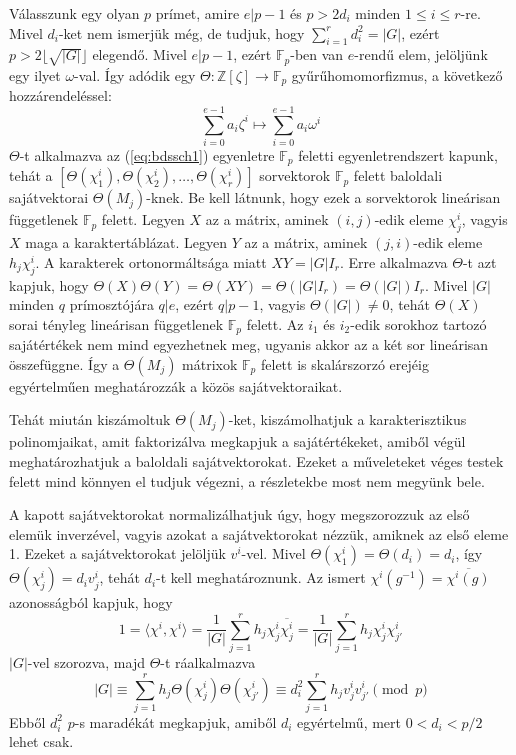 Válasszunk egy olyan $p$ prímet, amire $e|p-1$ és $p > 2 d_i$ minden $1\le i\le r$-re. Mivel $d_i$-ket nem ismerjük még, de tudjuk, hogy 
$\sum_{i=1}^r d_i^2 = |G|$, ezért $p > 2\lfloor \sqrt{|G|} \rfloor$ elegendő. Mivel $e|p-1$, ezért $\mathbb{F}_p$-ben van $e$-rendű elem, jelöljünk
egy ilyet $\omega$-val. Így adódik egy $\Theta : \mathbb{Z}[\zeta] \to \mathbb{F}_p$ gyűrűhomomorfizmus, a következő hozzárendeléssel:
\begin{equation*}
\sum_{i=0}^{e-1} a_i \zeta^i \mapsto \sum_{i=0}^{e-1} a_i \omega^i
\end{equation*}
$\Theta$-t alkalmazva az (\ref{eq:bdssch1}) egyenletre $\mathbb{F}_p$ feletti egyenletrendszert kapunk,
tehát a $[\Theta(\chi^i_1), \Theta(\chi^i_2), \dots, \Theta(\chi^i_r)]$ sorvektorok $\mathbb{F}_p$ felett baloldali sajátvektorai $\Theta(M_j)$-knek.
Be kell látnunk, hogy ezek a sorvektorok lineárisan függetlenek $\mathbb{F}_p$ felett.
Legyen $X$ az a mátrix, aminek $(i, j)$-edik eleme $\chi^i_j$, vagyis $X$ maga a karaktertáblázat.
Legyen $Y$ az a mátrix, aminek $(j, i)$-edik eleme $h_j\chi^i_j$.
A karakterek ortonormáltsága miatt $XY=|G|I_r$.
Erre alkalmazva $\Theta$-t azt kapjuk, hogy $\Theta(X)\Theta(Y)=\Theta(XY)=\Theta(|G|I_r)=\Theta(|G|)I_r$.
Mivel $|G|$ minden $q$ prímosztójára $q|e$, ezért $q|p-1$, vagyis $\Theta(|G|)\ne 0$, tehát $\Theta(X)$ sorai tényleg lineárisan függetlenek $\mathbb{F}_p$ felett.
Az $i_1$ és $i_2$-edik sorokhoz tartozó sajátértékek nem mind egyezhetnek meg, ugyanis akkor az a két sor lineárisan összefüggne.
Így a $\Theta(M_j)$ mátrixok $\mathbb{F}_p$ felett is skalárszorzó erejéig egyértelműen meghatározzák a közös sajátvektoraikat.

Tehát miután kiszámoltuk $\Theta(M_j)$-ket, kiszámolhatjuk a karakterisztikus polinomjaikat, amit faktorizálva megkapjuk a sajátértékeket, amiből végül meghatározhatjuk a baloldali sajátvektorokat.
Ezeket a műveleteket véges testek felett mind könnyen el tudjuk végezni, a részletekbe most nem megyünk bele.

A kapott sajátvektorokat normalizálhatjuk úgy, hogy megszorozzuk az első elemük inverzével, vagyis azokat a sajátvektorokat nézzük, amiknek az első eleme 1.
Ezeket a sajátvektorokat jelöljük $v^i$-vel. Mivel $\Theta(\chi^i_1)=\Theta(d_i)=d_i$, így $\Theta(\chi^i_j)=d_i v^i_j$, tehát $d_i$-t kell meghatároznunk.
Az ismert $\chi^i(g^{-1})=\overline{\chi^i(g)}$ azonosságból kapjuk, hogy
\begin{equation}
\label{eq:bdssch3}
1 = \langle \chi^i, \chi^i \rangle = \frac{1}{|G|}\sum_{j=1}^r h_j \chi^i_j \overline{\chi^i_j} = \frac{1}{|G|}\sum_{j=1}^r h_j \chi^i_j \chi^i_{j'}
\end{equation}
$|G|$-vel szorozva, majd $\Theta$-t ráalkalmazva
\begin{equation}
\label{eq:bdssch4}
|G| \equiv \sum_{j=1}^r h_j \Theta(\chi^i_j) \Theta(\chi^i_{j'}) \equiv d_i^2 \sum_{j=1}^r h_j v^i_j v^i_{j'} \pmod{p}
\end{equation}
Ebből $d_i^2$ $p$-s maradékát megkapjuk, amiből $d_i$ egyértelmű, mert $0<d_i<p/2$ lehet csak.

